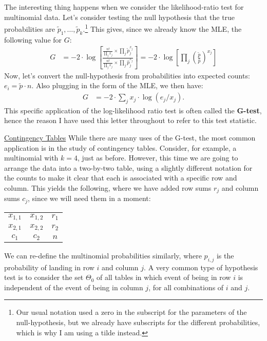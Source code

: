 \documentclass{tufte-handout}
\begin{document}
The interesting thing happens when we consider the likelihood-ratio
test for multinomial data. Let's consider testing the null hypothesis
that the true probabilities are $\tilde{p}_1, \ldots, \tilde{p}_k$.\footnote{
  Our usual notation used a zero in the subscript for the parameters of
  the null-hypothesis, but we already have subscripts for the different
  probabilities, which is why I am using a tilde instead.
}
This gives, since we already know the MLE, the following value for $G$:
\begin{align*}
G &= -2 \cdot \log \left[ \frac{
  \frac{n!}{\prod_j x_j} \times \prod_j \tilde{p}_j^{x_j}
}{
  \frac{n!}{\prod_j x_j} \times \prod_j \hat{p}_j^{x_j}
} \right] = -2 \cdot \log \left[ \prod_j \left( \frac{\tilde{p}}{\hat{p}} \right)^{x_j} \right]
\end{align*}
Now, let's convert the null-hypothesis from probabilities into expected
counts: $e_i = \tilde{p} \cdot n$. Also plugging in the form of the MLE,
we then have:
\begin{align*}
G &= -2 \cdot \sum_j x_j \cdot \log(e_j / x_j).
\end{align*}
This specific application of the log-likelihood ratio test is often called
the \textbf{G-test}, hence the reason I have used this letter throughout
to refer to this test statistic.

\newpage

\noindent \underline{Contingency Tables}
While there are many uses of the G-test, the most common application 
is in the study of contingency tables. Consider, for example, a multinomial
with $k=4$, just as before. However, this time we are going to arrange
the data into a two-by-two table, using a slightly different notation for
the counts to make it clear that each is associated with a specific row
and column. This yields the following, where we have added row sums $r_j$
and column sums $c_j$, since we will need them in a moment: 
\begin{center}
\begin{tabular}{*3c}
\cline{1-2}
  \multicolumn{1}{|c|}{$x_{1,1}$} &
  \multicolumn{1}{|c|}{$x_{1,2}$} &
  \multicolumn{1}{|c}{$r_1$} \\  
\cline{1-2}
  \multicolumn{1}{|c|}{$x_{2,1}$} &
  \multicolumn{1}{|c|}{$x_{2,2}$} &
  \multicolumn{1}{|c}{$r_2$} \\ 
\cline{1-2}
  \multicolumn{1}{c}{$c_1$}
  & \multicolumn{1}{c}{$c_2$}
  & \multicolumn{1}{c}{$n$}
\end{tabular}
\end{center}
We can re-define the multinomial probabilities similarly, where $p_{i,j}$
is the probability of landing in row $i$ and column $j$. A very common
type of hypothesis test is to consider the set $\Theta_0$ of all tables
in which event of being in row $i$ is independent of the event of being
in column $j$, for all combinations of $i$ and $j$.
\end{document}
